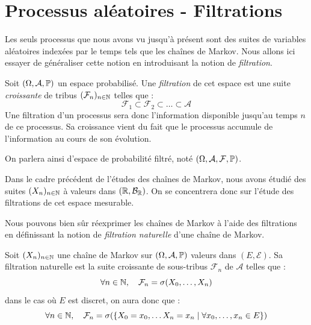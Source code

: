 


\section{Processus aléatoires - Filtrations}

Les seuls processus que nous avons vu jusqu'à présent sont des suites de variables aléatoires 
indexées par le temps tels que les chaînes de Markov. 
Nous allons ici essayer de généraliser cette notion en introduisant la notion de \emph{filtration}. 

\begin{definition}[Filtration]\label{def:filtration}
    Soit $( \Omega, \mathcal{A}, \mathbb{P})$ un espace probabilisé. Une \emph{filtration} de cet espace 
    est une suite \emph{croissante} de tribus $ ( \mathcal{F}_n)_{n \in \mathbb{N}}$ telles que : 
        $$ \mathcal{F}_1 \subset \mathcal{F}_2 \subset \dots \subset \mathcal{A} $$ 
    Une filtration d'un processus sera donc l'information disponible jusqu'au temps $n$ 
    de ce processus. Sa croissance vient du fait que le processus accumule de l'information 
    au cours de son évolution. 

    \medskip

    On parlera ainsi d'espace de probabilité filtré, noté $ ( \Omega, \mathcal{A}, \mathcal{F}, \mathbb{P})$. 
\end{definition}

Dans le cadre précédent de l'études des chaînes de Markov, nous avons étudié des suites $(X_n)_{n \in \mathbb{N}}$ 
à valeurs dans $ (\mathbb{R}, \mathcal{B}_{\mathbb{R}})$. On se concentrera donc sur l'étude des filtrations de cet espace mesurable. 

Nous pouvons bien sûr réexprimer les chaînes de Markov à l'aide des filtrations en définissant la notion de 
\emph{filtration naturelle} d'une chaîne de Markov. 

\begin{definition}
    Soit $(X_n)_{n \in \mathbb{N}}$ une chaîne de Markov sur $( \Omega, \mathcal{A}, \mathbb{P})$ valeurs dans $(E, \mathcal{E})$. Sa filtration naturelle est 
    la suite croissante de sous-tribus $ \mathcal{F}_n$  de $ \mathcal{A}$ telles que : 
        \begin{equation}\label{def:filtration-naturelle}
            \forall n \in \mathbb{N}, \quad \mathcal{F}_n = \sigma(X_0, \dots, X_n)
        \end{equation} 
    dans le cas où $E$ est discret, on aura donc que : 
        $$ \forall n \in \mathbb{N}, \quad \mathcal{F}_n = \sigma(\{X_0 = x_0, \dots X_n = x_n \mid \forall x_0, \dots, x_n \in E\}) $$ 
\end{definition}

